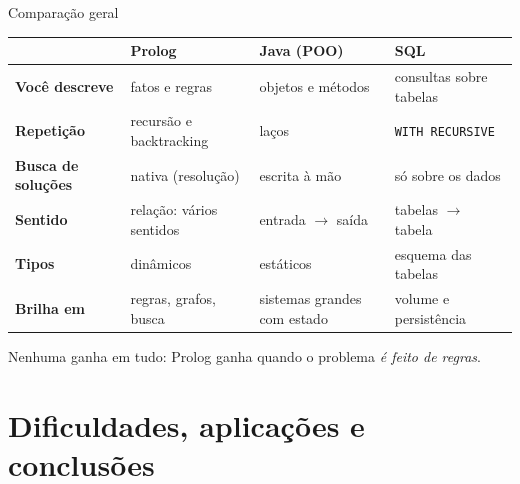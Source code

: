 \documentclass[aspectratio=169,11pt,xcolor=table]{beamer}
\newcommand{\destaque}[1]{%
  \begin{center}\colorbox{accent!10}{\parbox{0.92\linewidth}{\centering\strut #1\strut}}\end{center}}
\begin{document}
\begin{frame}{Comparação geral}
  \footnotesize
  \renewcommand{\arraystretch}{1.3}
  \begin{tabularx}{\linewidth}{@{}>{\bfseries}l P Y Y@{}}
    \toprule
    & \textbf{Prolog} & \textbf{Java (POO)} & \textbf{SQL} \\
    \midrule
    Você descreve & fatos e regras & objetos e métodos & consultas sobre tabelas \\
    Repetição & recursão e backtracking & laços & \texttt{WITH RECURSIVE} \\
    Busca de soluções & nativa (resolução) & escrita à mão & só sobre os dados \\
    Sentido & relação: vários sentidos & entrada $\to$ saída & tabelas $\to$ tabela \\
    Tipos & dinâmicos & estáticos & esquema das tabelas \\
    Brilha em & regras, grafos, busca & sistemas grandes com estado & volume e persistência \\
    \bottomrule
  \end{tabularx}
  \normalsize
  \destaque{\small Nenhuma ganha em tudo: Prolog ganha quando o problema \emph{é feito de regras}.}
\end{frame}

\section{Dificuldades, aplicações e conclusões}
\end{document}
